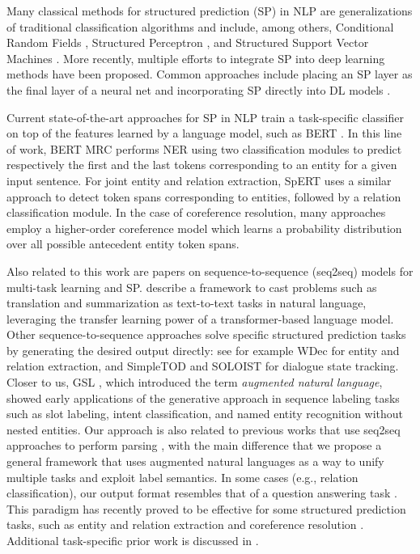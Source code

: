 Many classical methods for structured prediction (SP) in NLP are generalizations of traditional classification algorithms and include, among others, Conditional Random Fields
\citep{crf2001}, Structured Perceptron \citep{collins-2002}, and Structured Support Vector Machines
\citep{ioannis2004}.
More recently, multiple efforts to integrate SP into deep learning methods have been proposed. Common approaches include placing an SP layer as the final layer of a neural net \citep{collobert2011} and incorporating SP directly into DL models \citep{dyer-2015-dp}.

Current state-of-the-art approaches for SP in NLP train a task-specific classifier on top of the features learned by a \pretrained language model, such as BERT \citep{bert}.
In this line of work, BERT MRC \citep{bert_mrc} performs NER using two classification modules to predict respectively the first and the last tokens corresponding to an entity for a given input sentence.
For joint entity and relation extraction, SpERT \citep{spert} uses a similar approach to detect token spans corresponding to entities, followed by a relation classification module.
In the case of coreference resolution, many approaches employ a higher-order coreference model \citep{lee-etal-2018-higher} which learns a probability distribution over all possible antecedent entity token spans.

Also related to this work are papers on sequence-to-sequence (seq2seq) models for multi-task learning and SP.
\citet{t5} describe a framework to cast problems such as translation and summarization as text-to-text tasks in natural language, leveraging the transfer learning power of a transformer-based language model.
Other sequence-to-sequence approaches solve specific structured prediction tasks by generating the desired output directly: see for example WDec \citep{Wdec} for entity and relation extraction, and SimpleTOD \citep{hosseiniasl2020simple} and SOLOIST \citep{SOLOIST} for dialogue state tracking.
Closer to us, GSL \citep{gsl}, which introduced the term \emph{augmented natural language}, showed early applications of the generative approach in sequence labeling tasks such as slot labeling, intent classification, and named entity recognition without nested entities.
Our approach is also related to previous works that use seq2seq approaches to perform parsing \citep{oriol_NIPS2015,dyer-etal-2016-recurrent,choe-charniak-2016-parsing,Rongali_2020}, with the main difference that we propose a general framework that uses augmented natural languages as a way to unify multiple tasks and exploit label semantics.
In some cases (e.g., relation classification), our output format resembles that of a question answering task \citep{multitask-learning-QA}.
This paradigm has recently proved to be effective for some structured prediction tasks, such as entity and relation extraction and coreference resolution \citep{multiturnQA, MRC4ERE, CorefQA}.
Additional task-specific prior work is discussed in .

